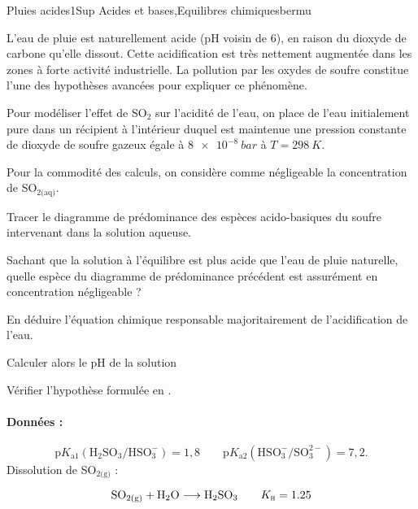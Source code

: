 
\begin{exercise}{Pluies acides}{1}{Sup}
{Acides et bases,Equilibres chimiques}{bermu}

L’eau de pluie est naturellement acide (pH voisin de 6), en raison du dioxyde de carbone qu’elle
dissout. Cette acidification est très nettement augmentée dans les zones à forte activité industrielle. La
pollution par les oxydes de soufre constitue l’une des hypothèses avancées pour expliquer ce
phénomène.

Pour modéliser l’effet de SO$_2$ sur l’acidité de l’eau, on place de l’eau initialement pure dans un récipient
à l’intérieur duquel est maintenue une pression constante de dioxyde de soufre gazeux égale à $\SI{8e-8}{bar}$ à $T = \SI{298}{K}$.

Pour la commodité des calculs, on considère comme négligeable la concentration de SO$_{2\text{(aq)}}$.

\begin{questions}

    \question Tracer le diagramme de prédominance des espèces acido-basiques du soufre intervenant dans la
solution aqueuse.

    \question Sachant que la solution à l’équilibre est plus acide que l’eau de pluie naturelle, quelle espèce du
diagramme de prédominance précédent est assurément en concentration négligeable ?

    \question En déduire l’équation chimique responsable majoritairement de l’acidification de l’eau.

    \question Calculer alors le pH de la solution
    
    \plusloin Vérifier l’hypothèse formulée en .
    
\end{questions}

\paragraph{Données :}
$$\text{p}K_\text{a1}(\mathrm{H_2SO_3/HSO_3^-}) = 1,8  \qquad \text{p}K_\text{a2}(\mathrm{HSO_3^-/SO_{3}^{2-}}) = 7,2.$$
Dissolution de SO$_{2\text{(g)}}$ :

$$\mathrm{SO_{2(g)} + H_2O \longrightarrow H_2SO_3} \qquad K_\textsc{h} = \SI{1,25}{}$$

\end{exercise}

